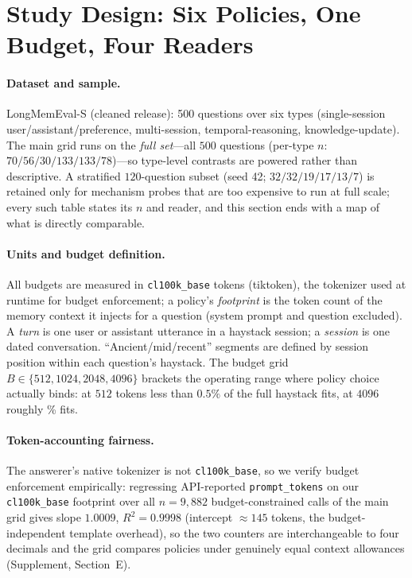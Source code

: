 \documentclass{article} %
\begin{document}
\section{Study Design: Six Policies, One Budget, Four Readers}
\label{sec:design}

\paragraph{Dataset and sample.} LongMemEval-S (cleaned release): 500 questions over six
types (single-session user/assistant/preference, multi-session, temporal-reasoning,
knowledge-update). The main grid runs on the \emph{full set}---all $500$ questions
(per-type $n$: $70/56/30/133/133/78$)---so type-level contrasts are powered rather than
descriptive. A stratified $120$-question subset (seed 42; $32/32/19/17/13/7$) is retained
only for mechanism probes that are too expensive to run at full scale; every such table
states its $n$ and reader, and this section ends with a map of what is directly comparable.

\paragraph{Units and budget definition.} All budgets are measured in
\texttt{cl100k\_base} tokens (tiktoken), the tokenizer used at runtime for budget
enforcement; a policy's \emph{footprint} is the token count of the memory context it
injects for a question (system prompt and question excluded). A \emph{turn} is one user
or assistant utterance in a haystack session; a \emph{session} is one dated
conversation. ``Ancient/mid/recent'' segments are defined by session position within
each question's haystack. The budget grid $B \in \{512, 1024, 2048, 4096\}$ brackets the
operating range where policy choice actually binds: at $512$ tokens less than $0.5\%$ of
the full haystack fits, at $4096$ roughly \fcAtLarge{}\% fits.

\paragraph{Token-accounting fairness.} The answerer's native tokenizer is not
\texttt{cl100k\_base}, so we verify budget enforcement empirically: regressing API-reported
\texttt{prompt\_tokens} on our \texttt{cl100k\_base} footprint over all $n{=}9{,}882$
budget-constrained calls of the main grid gives slope $1.0009$, $R^2{=}0.9998$ (intercept
$\approx 145$ tokens, the budget-independent template overhead), so the two counters are
interchangeable to four decimals and the grid compares policies under genuinely equal
context allowances (Supplement, Section~E).
\end{document}
